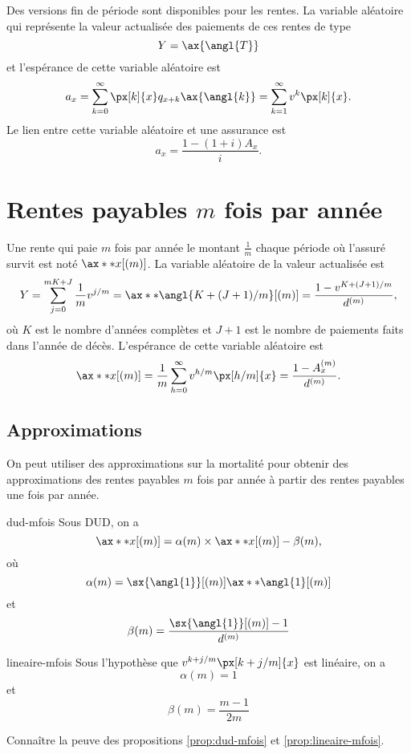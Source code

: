 Des versions fin de période sont disponibles pour les rentes. La variable aléatoire qui représente la valeur actualisée des paiements de ces rentes de type
$$ Y = \ax{\angl{T}}$$
et l'espérance de cette variable aléatoire est 
$$a_x = \sum_{k = 0}^{\infty} \px[k]{x} q_{x + k} \ax{\angl{k}} = \sum_{k = 1}^{\infty} v^k \px[k]{x}.$$
Le lien entre cette variable aléatoire et une assurance est 
$$a_x = \frac{1 - (1 + i)A_x}{i}.$$

\section{Rentes payables $m$ fois par année}

\begin{definition}{}{}
	Une rente qui paie $m$ fois par année le montant $\frac{1}{m}$ chaque période où l'assuré survit est noté $\ax**{x}[(m)]$. La variable aléatoire de la valeur actualisée est
	$$Y = \sum_{j = 0}^{mK + J}\frac{1}{m}v^{j/m} = \ax**{\angl{K + (J + 1)/m}}[(m)] = \frac{1 - v^{K + (J + 1)/m}}{d^{(m)}},$$
	où $K$ est le nombre d'années complètes et $J + 1$ est le nombre de paiements faits dans l'année de décès. L'espérance de cette variable aléatoire est 
	$$\ax**{x}[(m)] = \frac{1}{m}\sum_{h = 0}^{\infty} v^{h/m}\px[h/m]{x} = \frac{1 - A_x^{(m)}}{d^{(m)}}.$$
\end{definition}

\subsection{Approximations}

On peut utiliser des approximations sur la mortalité pour obtenir des approximations des rentes payables $m$ fois par année à partir des rentes payables une fois par année. 

\begin{proposition}{}{dud-mfois}
	Sous DUD, on a 
	$$\ax**{x}[(m)] = \alpha(m)\times \ax**{x}[(m)] - \beta(m),$$
	où 
	$$\alpha(m) = \sx{\angl{1}}[(m)]\ax**{\angl{1}}[(m)]$$
	et
	$$\beta(m) = \frac{\sx{\angl{1}}[(m)] - 1}{d^{(m)}}$$
\end{proposition}

\begin{proposition}{}{lineaire-mfois}
	Sous l'hypothèse que $v^{k + j/m}\px[k + j/m]{x}$ est linéaire, on a 
	$$\alpha(m) = 1$$
	et
	$$\beta(m) = \frac{m-1}{2m}$$
\end{proposition}

Connaître la peuve des propositions \ref{prop:dud-mfois} et \ref{prop:lineaire-mfois}.

